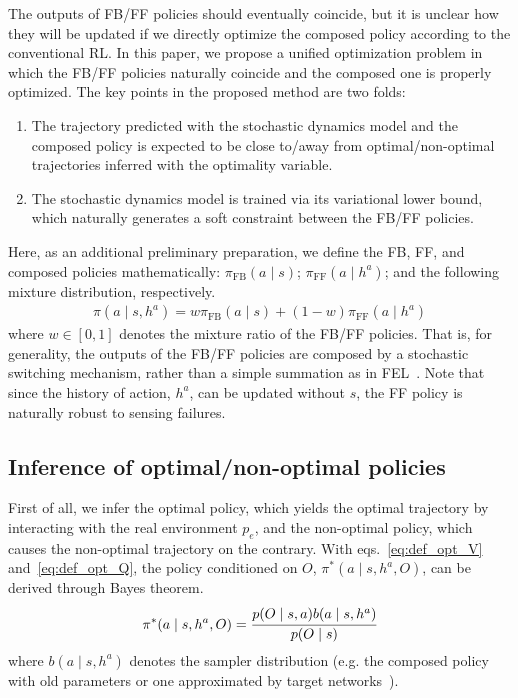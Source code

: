 \documentclass{bmcart}
\begin{document}
The outputs of FB/FF policies should eventually coincide, but it is unclear how they will be updated if we directly optimize the composed policy according to the conventional RL.
In this paper, we propose a unified optimization problem in which the FB/FF policies naturally coincide and the composed one is properly optimized.
The key points in the proposed method are two folds:
\begin{enumerate}
    \item The trajectory predicted with the stochastic dynamics model and the composed policy is expected to be close to/away from optimal/non-optimal trajectories inferred with the optimality variable.
    \item The stochastic dynamics model is trained via its variational lower bound, which naturally generates a soft constraint between the FB/FF policies.
\end{enumerate}

Here, as an additional preliminary preparation, we define the FB, FF, and composed policies mathematically: $\pi_\mathrm{FB}(a \mid s)$; $\pi_\mathrm{FF}(a \mid h^a)$; and the following mixture distribution, respectively.
\begin{align}
    \pi(a \mid s, h^a) = w \pi_\mathrm{FB}(a \mid s) + (1 - w) \pi_\mathrm{FF}(a \mid h^a)
    \label{eq:def_policy_mix}
\end{align}
where $w \in [0, 1]$ denotes the mixture ratio of the FB/FF policies.
That is, for generality, the outputs of the FB/FF policies are composed by a stochastic switching mechanism, rather than a simple summation as in FEL~\cite{miyamoto1988feedback}.
Note that since the history of action, $h^a$, can be updated without $s$, the FF policy is naturally robust to sensing failures.

\subsection{Inference of optimal/non-optimal policies}

First of all, we infer the optimal policy, which yields the optimal trajectory by interacting with the real environment $p_e$, and the non-optimal policy, which causes the non-optimal trajectory on the contrary.
With eqs.~\eqref{eq:def_opt_V} and~\eqref{eq:def_opt_Q}, the policy conditioned on $O$, $\pi^*(a \mid s, h^a, O)$, can be derived through Bayes theorem.
\begin{align}
    \pi^*(a \mid s, h^a, O) = \cfrac{p(O \mid s, a) b(a \mid s, h^a)}{p(O \mid s)}
    \label{eq:policy_cond}
\end{align}
where $b(a \mid s, h^a)$ denotes the sampler distribution (e.g. the composed policy with old parameters or one approximated by target networks~\cite{kobayashi2021t}).
\end{document}
